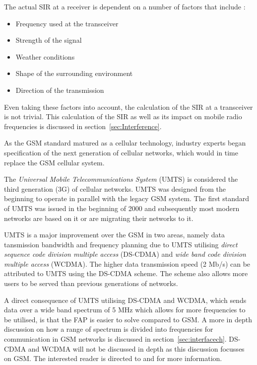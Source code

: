 The actual SIR at a receiver is dependent on a number of factors that include \cite{GSMArchitectureProtocolsServices,Karen2004}:
\begin{itemize}
\item Frequency used at the transceiver
\item Strength of the signal
\item Weather conditions
\item Shape of the surrounding environment
\item Direction of the transmission
\end{itemize}
Even taking these factors into account, the calculation of the SIR at a transceiver is not trivial. This calculation of the SIR as well as its impact on mobile radio frequencies is discussed in section~\ref{sec:Interference}.

As the GSM standard matured as a cellular technology, industry experts began specification of the next generation of cellular networks, which would in time replace the GSM cellular system. 

The \emph{Universal Mobile Telecommunications System} (UMTS) is considered the third generation (3G) of cellular networks\cite{tabuglobalplanning3g,Eisenblatter}. UMTS was designed from the beginning to operate in parallel with the legacy GSM system. The first standard of UMTS was issued in the beginning of 2000 and subsequently most modern networks are based on it or are migrating their networks to it\cite{tabuglobalplanning3g,Eisenblatter}.

UMTS is a major improvement over the GSM in two areas, namely data tansmission bandwidth and frequency planning due to UMTS utilising \emph{direct sequence code division multiple access} (DS-CDMA) and \emph{wide band code division multiple access} (WCDMA)\cite{tabuglobalplanning3g,Eisenblatter}. The higher data transmission speed (2 Mb/s) can be attributed to UMTS using the DS-CDMA scheme\cite{tabuglobalplanning3g,Eisenblatter}. The scheme also allows more users to be served than previous generations of networks\cite{tabuglobalplanning3g,Eisenblatter}. 

A direct consequence of UMTS utilising DS-CDMA and WCDMA, which sends data over a wide band spectrum of 5 MHz which allows for more frequencies to be utilised, is that the FAP is easier to solve compared to GSM\cite{tabuglobalplanning3g,Eisenblatter}\@. A more in depth discussion on how a range of spectrum is divided into frequencies for communication in GSM networks is discussed in section~\ref{sec:interfacech}. DS-CDMA and WCDMA will not be discussed in depth as this discussion focusses on GSM\@. The interested reader is directed to \cite{tabuglobalplanning3g} and \cite{wirelesstelcoMullet} for more information.

